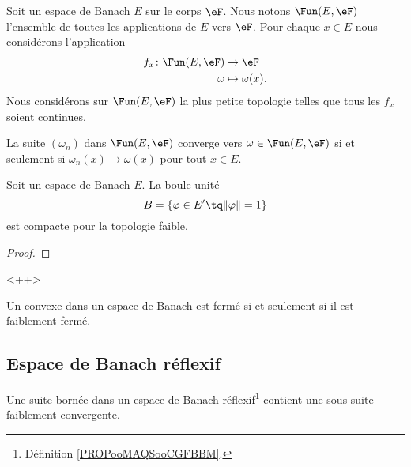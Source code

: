 \begin{lemma}       \label{LEMooMCYAooGMzbbs}
    Soit un espace de Banach \( E\) sur le corps \( \eF\). Nous notons \( \Fun(E,\eF)\) l'ensemble de toutes les applications de \( E\) vers \( \eF\). Pour chaque \( x\in E\) nous considérons l'application
    \begin{equation}
        \begin{aligned}
            f_x\colon \Fun(E,\eF)&\to \eF \\
            \omega&\mapsto \omega(x). 
        \end{aligned}
    \end{equation}
    Nous considérons sur \( \Fun(E,\eF)\) la plus petite topologie telles que tous les \( f_x\) soient continues.

    La suite \( (\omega_n)\) dans \( \Fun(E,\eF)\) converge vers  \(\omega\in \Fun(E,\eF)\) si et seulement si \( \omega_n(x)\to\omega(x)\) pour tout \( x\in E\).
\end{lemma}


\begin{theorem}       \label{THOooRECTooEVLHSq}
    Soit un espace de Banach \( E\). La boule unité
    \begin{equation}
        B=\{ \varphi\in E'\tq \| \varphi \|=1 \}
    \end{equation}
    est compacte pour la topologie faible.
\end{theorem}

\begin{proof}
    
\end{proof}
<++>


\begin{proposition}       \label{PROPooYARHooOpmztY}
	Un convexe dans un espace de Banach est fermé si et seulement si il est faiblement fermé.
\end{proposition}

\subsection{Espace de Banach réflexif}

\begin{proposition}       \label{PROPooPVVYooMZjQSq}
	Une suite bornée dans un espace de Banach réflexif\footnote{Définition \ref{PROPooMAQSooCGFBBM}.} contient une sous-suite faiblement convergente.
\end{proposition}

